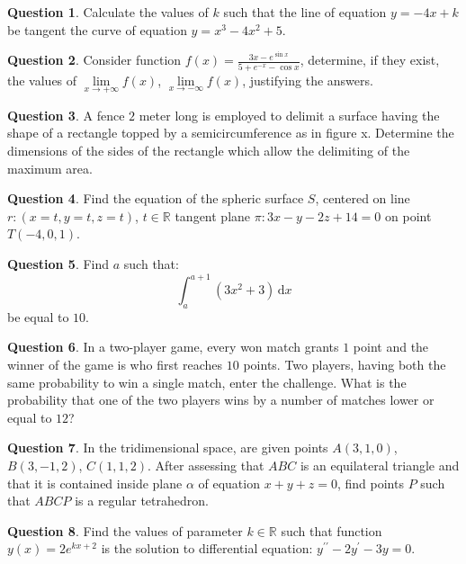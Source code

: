 \documentclass[a4paper,12pt,reqno]{amsart}
\theoremstyle{definition}
\newtheorem{quest}{Question}
\begin{document}
\begin{quest}
Calculate the values of $k$ such that the line of equation $y=-4x+k$ be tangent the curve of equation
$y=x^3-4x^2+5$.
\end{quest}

\begin{quest}
Consider function $f(x) = \frac{3x - e^{\sin x}}{5 + e^{-x}-\cos x}$, determine, if they exist, the values of
$\lim\limits_{x \to +\infty} f(x)$, $\lim\limits_{x \to -\infty} f(x)$, justifying the answers.
\end{quest}

\begin{quest}
A fence $2$ meter long is employed to delimit a surface having the shape of a rectangle topped by a
semicircumference as in figure x.
Determine the dimensions of the sides of the rectangle which allow the delimiting of the maximum area.
\end{quest}

\begin{quest}
Find the equation of the spheric surface $S$, centered on line $r: (x=t, y=t, z=t)$, $t \in \mathbb{R}$
tangent plane $\pi: 3x - y -2z + 14 = 0$ on point $T(-4,0,1)$.
\end{quest}

\begin{quest}
Find $a$ such that:
\begin{equation*}
\int_a^{a+1} \left(3x^2+3\right) \, \mathrm{d} x
\end{equation*}
be equal to $10$.
\end{quest}

\begin{quest}
In a two-player game, every won match grants $1$ point and the winner of the game is who first 
reaches $10$ points.
Two players, having both the same probability to win a single match, enter the challenge. What is
the probability that one of the two players wins by a number of matches lower or equal to $12$?
\end{quest}

\begin{quest}
In the tridimensional space, are given points $A(3,1,0)$, $B(3,-1,2)$, $C(1,1,2)$. After assessing that
$ABC$ is an equilateral triangle and that it is contained inside plane $\alpha$ of equation $x+y+z=0$,
find points $P$ such that $ABCP$ is a regular tetrahedron.
\end{quest}

\begin{quest}
Find the values of parameter $k \in \mathbb{R}$ such that function $y(x)=2e^{kx+2}$ is the solution
to differential equation: $y^{\prime\prime} -2y^\prime - 3y = 0$.
\end{quest}
\end{document}
